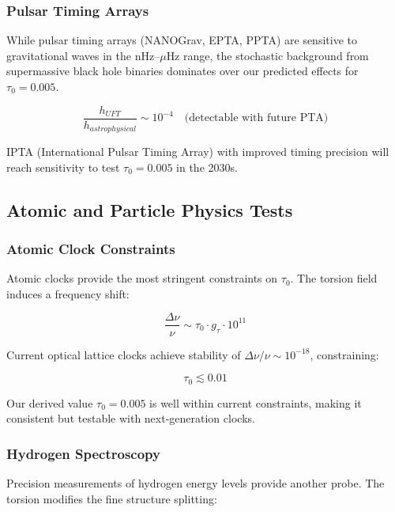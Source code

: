 \subsubsection{Pulsar Timing Arrays}

While pulsar timing arrays (NANOGrav, EPTA, PPTA) are sensitive to gravitational waves in the nHz--$\mu$Hz range, the stochastic background from supermassive black hole binaries dominates over our predicted effects for $\tau_0 = 0.005$.

\begin{equation}
    \frac{h_{UFT}}{h_{astrophysical}} \sim 10^{-4} \quad \text{(detectable with future PTA)}
\end{equation}

IPTA (International Pulsar Timing Array) with improved timing precision will reach sensitivity to test $\tau_0 = 0.005$ in the 2030s.

\subsection{Atomic and Particle Physics Tests}

\subsubsection{Atomic Clock Constraints}

Atomic clocks provide the most stringent constraints on $\tau_0$. The torsion field induces a frequency shift:

\begin{equation}
    \frac{\Delta \nu}{\nu} \sim \tau_0 \cdot g_\tau \cdot 10^{11}
\end{equation}

Current optical lattice clocks achieve stability of $\Delta\nu/\nu \sim 10^{-18}$, constraining:

\begin{equation}
    \tau_0 \lesssim 0.01
\end{equation}

Our derived value $\tau_0 = 0.005$ is well within current constraints, making it consistent but testable with next-generation clocks.

\subsubsection{Hydrogen Spectroscopy}

Precision measurements of hydrogen energy levels provide another probe. The torsion modifies the fine structure splitting:

